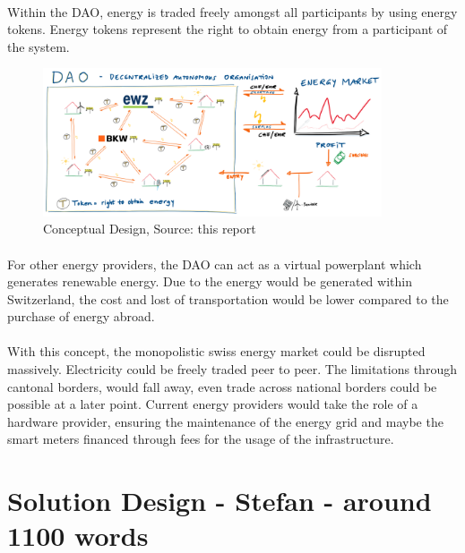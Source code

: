 \documentclass{scrartcl}
\begin{document}
	\paragraph{}
	Within the DAO, energy is traded freely amongst all participants by using energy tokens. Energy tokens represent the right to obtain energy from a participant of the system.
    
    \begin{figure} [h]
    	\centering
    	\includegraphics[width=100mm,scale=0.5]{03_conceptual_design_picture01.PNG}
    	\caption{Conceptual Design, Source: this report}
    \end{figure}
    
    \paragraph{}
    For other energy providers, the DAO can act as a virtual powerplant which generates renewable energy. Due to the energy would be generated within Switzerland, the cost and lost of transportation would be lower compared to the purchase of energy abroad.
    
     \paragraph{}
     With this concept, the monopolistic swiss energy market could be disrupted massively. Electricity could be freely traded peer to peer. The limitations through cantonal borders, would fall away, even trade across national borders could be possible at a later point. Current energy providers would take the role of a hardware provider, ensuring the maintenance of the energy grid and maybe the smart meters financed through fees for the usage of the infrastructure.
     
     
    
    \section{Solution Design - Stefan - around 1100 words}
   
\end{document}
